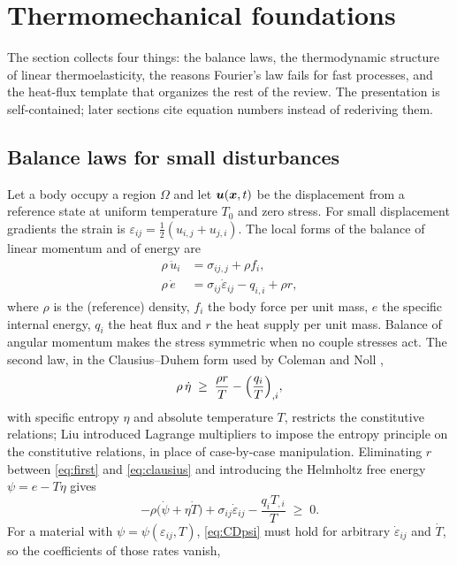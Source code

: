 \section{Thermomechanical foundations}\label{sec:foundations}
The section collects four things: the balance laws, the thermodynamic structure of linear thermoelasticity, the reasons Fourier's law fails for fast processes, and the heat-flux template that organizes the rest of the review. The presentation is self-contained; later sections cite equation numbers instead of rederiving them.

\subsection{Balance laws for small disturbances}
Let a body occupy a region $\Omega$ and let $\bm u(\bm x,t)$ be the displacement from a reference state at uniform temperature $T_0$ and zero stress. For small displacement gradients the strain is $\varepsilon_{ij}=\tfrac12(u_{i,j}+u_{j,i})$. The local forms of the balance of linear momentum and of energy are
\begin{align}
\rho\,\ddot u_i &= \sigma_{ij,j}+\rho f_i, \label{eq:mom}\\
\rho\,\dot e &= \sigma_{ij}\dot\varepsilon_{ij}-q_{i,i}+\rho r, \label{eq:first}
\end{align}
where $\rho$ is the (reference) density, $f_i$ the body force per unit mass, $e$ the specific internal energy, $q_i$ the heat flux and $r$ the heat supply per unit mass. Balance of angular momentum makes the stress symmetric when no couple stresses act. The second law, in the Clausius--Duhem form used by Coleman and Noll \citep{Coleman1963},
\begin{equation}
\rho\,\dot\eta \;\ge\; \frac{\rho r}{T}-\Bigl(\frac{q_i}{T}\Bigr)_{,i}, \label{eq:clausius}
\end{equation}
with specific entropy $\eta$ and absolute temperature $T$, restricts the constitutive relations; Liu \citep{Liu1972} introduced Lagrange multipliers to impose the entropy principle on the constitutive relations, in place of case-by-case manipulation. Eliminating $r$ between \eqref{eq:first} and \eqref{eq:clausius} and introducing the Helmholtz free energy $\psi=e-T\eta$ gives
\begin{equation}
-\rho\bigl(\dot\psi+\eta\dot T\bigr)+\sigma_{ij}\dot\varepsilon_{ij}-\frac{q_i T_{,i}}{T}\;\ge\;0. \label{eq:CDpsi}
\end{equation}
For a material with $\psi=\psi(\varepsilon_{ij},T)$, \eqref{eq:CDpsi} must hold for arbitrary $\dot\varepsilon_{ij}$ and $\dot T$, so the coefficients of those rates vanish,

